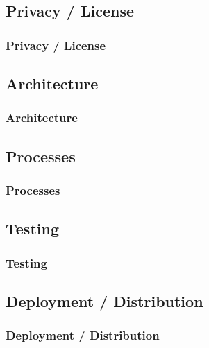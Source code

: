 \begin{frame}
    \subsection{Privacy / License}\label{subsec:privacy-and-license}
    \frametitle{Privacy / License}
\end{frame}

\begin{frame}
    \subsection{Architecture}\label{subsec:architecture}
    \frametitle{Architecture}
\end{frame}

\begin{frame}
    \subsection{Processes}\label{subsec:processes}
    \frametitle{Processes}
\end{frame}

\begin{frame}
    \subsection{Testing}\label{subsec:testing}
    \frametitle{Testing}
\end{frame}

\begin{frame}
    \subsection{Deployment / Distribution}\label{subsec:deployment-and-distribution}
    \frametitle{Deployment / Distribution}
\end{frame}

